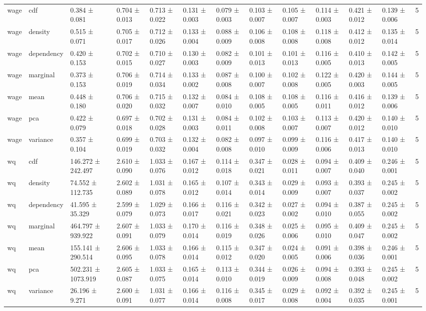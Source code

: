 \begin{table}
\begin{tabular}{llllllllllllr}
wage & cdf & 0.384 ± 0.081 & 0.704 ± 0.013 & 0.713 ± 0.022 & 0.131 ± 0.003 & 0.079 ± 0.003 & 0.103 ± 0.007 & 0.105 ± 0.007 & 0.114 ± 0.003 & 0.421 ± 0.012 & 0.139 ± 0.006 & 5 \\
wage & density & 0.515 ± 0.071 & 0.705 ± 0.017 & 0.712 ± 0.026 & 0.133 ± 0.004 & 0.088 ± 0.009 & 0.106 ± 0.008 & 0.108 ± 0.008 & 0.118 ± 0.008 & 0.412 ± 0.012 & 0.135 ± 0.014 & 5 \\
wage & dependency & 0.420 ± 0.153 & 0.702 ± 0.015 & 0.710 ± 0.027 & 0.130 ± 0.003 & 0.082 ± 0.009 & 0.101 ± 0.013 & 0.101 ± 0.013 & 0.116 ± 0.005 & 0.410 ± 0.013 & 0.142 ± 0.005 & 5 \\
wage & marginal & 0.373 ± 0.153 & 0.706 ± 0.019 & 0.714 ± 0.034 & 0.133 ± 0.002 & 0.087 ± 0.008 & 0.100 ± 0.007 & 0.102 ± 0.008 & 0.122 ± 0.005 & 0.420 ± 0.003 & 0.144 ± 0.005 & 5 \\
wage & mean & 0.448 ± 0.180 & 0.706 ± 0.020 & 0.715 ± 0.032 & 0.132 ± 0.007 & 0.084 ± 0.010 & 0.108 ± 0.005 & 0.108 ± 0.005 & 0.116 ± 0.011 & 0.416 ± 0.012 & 0.139 ± 0.006 & 5 \\
wage & pca & 0.422 ± 0.079 & 0.697 ± 0.018 & 0.702 ± 0.028 & 0.131 ± 0.003 & 0.084 ± 0.011 & 0.102 ± 0.008 & 0.103 ± 0.007 & 0.113 ± 0.007 & 0.420 ± 0.012 & 0.140 ± 0.010 & 5 \\
wage & variance & 0.357 ± 0.104 & 0.699 ± 0.019 & 0.703 ± 0.032 & 0.132 ± 0.004 & 0.082 ± 0.008 & 0.097 ± 0.010 & 0.099 ± 0.009 & 0.116 ± 0.006 & 0.417 ± 0.013 & 0.140 ± 0.010 & 5 \\
wq & cdf & 146.272 ± 242.497 & 2.610 ± 0.090 & 1.033 ± 0.076 & 0.167 ± 0.012 & 0.114 ± 0.018 & 0.347 ± 0.021 & 0.028 ± 0.011 & 0.094 ± 0.007 & 0.409 ± 0.040 & 0.246 ± 0.001 & 5 \\
wq & density & 74.552 ± 112.735 & 2.602 ± 0.089 & 1.031 ± 0.078 & 0.165 ± 0.012 & 0.107 ± 0.014 & 0.343 ± 0.014 & 0.029 ± 0.009 & 0.093 ± 0.007 & 0.393 ± 0.037 & 0.245 ± 0.002 & 5 \\
wq & dependency & 41.595 ± 35.329 & 2.599 ± 0.079 & 1.029 ± 0.073 & 0.166 ± 0.017 & 0.116 ± 0.021 & 0.342 ± 0.023 & 0.027 ± 0.002 & 0.094 ± 0.010 & 0.387 ± 0.055 & 0.245 ± 0.002 & 5 \\
wq & marginal & 464.797 ± 939.922 & 2.607 ± 0.091 & 1.033 ± 0.079 & 0.170 ± 0.014 & 0.116 ± 0.019 & 0.348 ± 0.026 & 0.025 ± 0.006 & 0.095 ± 0.010 & 0.409 ± 0.047 & 0.245 ± 0.002 & 5 \\
wq & mean & 155.141 ± 290.514 & 2.606 ± 0.095 & 1.033 ± 0.078 & 0.166 ± 0.014 & 0.115 ± 0.012 & 0.347 ± 0.020 & 0.024 ± 0.005 & 0.091 ± 0.006 & 0.398 ± 0.036 & 0.246 ± 0.001 & 5 \\
wq & pca & 502.231 ± 1073.919 & 2.605 ± 0.087 & 1.033 ± 0.075 & 0.165 ± 0.014 & 0.113 ± 0.010 & 0.344 ± 0.019 & 0.026 ± 0.009 & 0.094 ± 0.008 & 0.393 ± 0.048 & 0.245 ± 0.002 & 5 \\
wq & variance & 26.196 ± 9.271 & 2.600 ± 0.091 & 1.031 ± 0.077 & 0.166 ± 0.014 & 0.116 ± 0.008 & 0.345 ± 0.017 & 0.029 ± 0.008 & 0.092 ± 0.004 & 0.392 ± 0.035 & 0.245 ± 0.001 & 5 \\
\bottomrule
\end{tabular}
\end{table}

